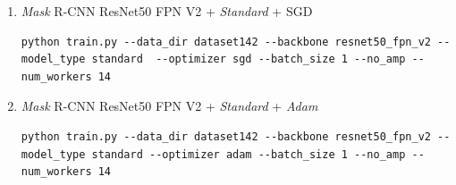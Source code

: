 \begin{enumerate}
\item \textit{Mask} R-CNN ResNet50 FPN V2 + \textit{Standard} + SGD \smallskip
\begin{lstlisting}
python train.py --data_dir dataset142 --backbone resnet50_fpn_v2 --model_type standard  --optimizer sgd --batch_size 1 --no_amp --num_workers 14 
\end{lstlisting}
\medskip

\item \textit{Mask} R-CNN ResNet50 FPN V2 + \textit{Standard} + \textit{Adam} \smallskip
\begin{lstlisting}
python train.py --data_dir dataset142 --backbone resnet50_fpn_v2 --model_type standard --optimizer adam --batch_size 1 --no_amp --num_workers 14 
\end{lstlisting}
\end{enumerate}





